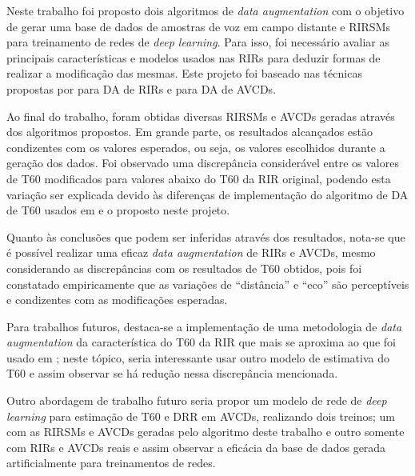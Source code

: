 Neste trabalho foi proposto dois algoritmos de \textit{data augmentation} com o objetivo de gerar uma base de dados de amostras de voz 
em campo distante e RIRSMs para treinamento de redes de \textit{deep learning}.
Para isso, foi necessário avaliar as principais características e modelos usados nas RIRs para deduzir formas de realizar
a modificação das mesmas. Este projeto foi baseado nas técnicas propostas por \cite{RIR_Data_Aug} para DA de RIRs e \cite{Speech_Rec}
para DA de AVCDs.

Ao final do trabalho, foram obtidas diversas RIRSMs e AVCDs geradas através dos algoritmos propostos. 
Em grande parte, os resultados alcançados estão condizentes com os valores esperados, ou seja, os valores
escolhidos durante a geração dos dados. Foi observado uma discrepância considerável entre os valores de T60 modificados 
para valores abaixo do T60 da RIR original, podendo esta variação ser explicada devido às diferenças de implementação 
do algoritmo de DA de T60 usados em \cite{RIR_Data_Aug} e o proposto neste projeto.

Quanto às conclusões que podem ser inferidas através dos resultados, nota-se que é possível realizar uma eficaz
\textit{data augmentation} de RIRs e AVCDs, mesmo considerando as discrepâncias com os resultados de T60 obtidos,
pois foi constatado empiricamente que as variações de “distância” e “eco” são perceptíveis e condizentes com as modificações
esperadas.

Para trabalhos futuros, destaca-se a implementação de uma metodologia de \textit{data augmentation} da característica do T60
da RIR que mais se aproxima ao que foi usado em \cite{RIR_Data_Aug}; neste tópico, seria interessante usar outro modelo
de estimativa do T60 e assim observar se há redução nessa discrepância mencionada.

Outro abordagem de trabalho futuro seria propor um modelo de rede de \textit{deep learning} para estimação de T60 e DRR em AVCDs,
realizando dois treinos; um com as RIRSMs e AVCDs geradas pelo algoritmo deste trabalho e outro somente com RIRs e AVCDs reais e 
assim observar a eficácia da base de dados gerada artificialmente para treinamentos de redes.



